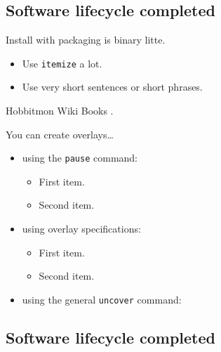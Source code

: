 \documentclass{beamer}
\begin{document}
\subsection[User community]{Software lifecycle completed}

\begin{frame}{Install with packaging is binary litte.}

  \begin{itemize}
  \item
    Use \texttt{itemize} a lot.
  \item
    Use very short sentences or short phrases.
  \end{itemize}
\end{frame}

\begin{frame}{Hobbitmon Wiki Books .}

  You can create overlays\dots
  \begin{itemize}
  \item using the \texttt{pause} command:
    \begin{itemize}
    \item
      First item.
      \pause
    \item    
      Second item.
    \end{itemize}
  \item
    using overlay specifications:
    \begin{itemize}
    \item<3->
      First item.
    \item<4->
      Second item.
    \end{itemize}
  \item
    using the general \texttt{uncover} command:
    \begin{itemize}
    \end{itemize}
  \end{itemize}

\end{frame}


\subsection[Developer community]{Software lifecycle completed}
\end{document}
